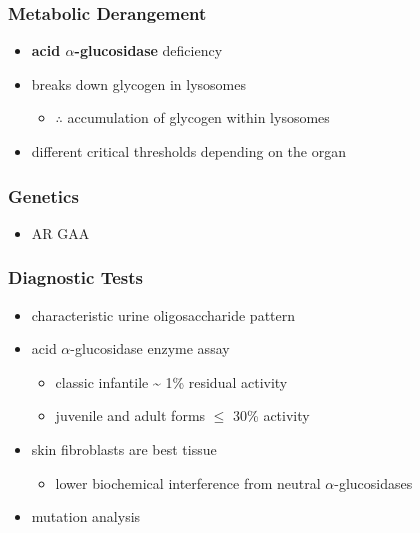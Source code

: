 \documentclass{scrartcl}
\begin{document}
\subsubsection{Metabolic Derangement}
\label{sec:org609be10}
\begin{itemize}
\item \textbf{acid \(\alpha\)-glucosidase} deficiency
\item breaks down glycogen in lysosomes
\begin{itemize}
\item \(\therefore\) accumulation of glycogen within lysosomes
\end{itemize}
\item different critical thresholds depending on the organ
\end{itemize}
\subsubsection{Genetics}
\label{sec:org9d20f79}
\begin{itemize}
\item AR GAA
\end{itemize}

\subsubsection{Diagnostic Tests}
\label{sec:orgb684dd0}
\begin{itemize}
\item characteristic urine oligosaccharide pattern
\item acid \(\alpha\)-glucosidase enzyme assay
\begin{itemize}
\item classic infantile \textasciitilde{} 1\% residual activity
\item juvenile and adult forms \(\le\) 30\% activity
\end{itemize}
\item skin fibroblasts are best tissue
\begin{itemize}
\item lower biochemical interference from neutral \(\alpha\)-glucosidases
\end{itemize}
\item mutation analysis
\end{itemize}
\end{document}
